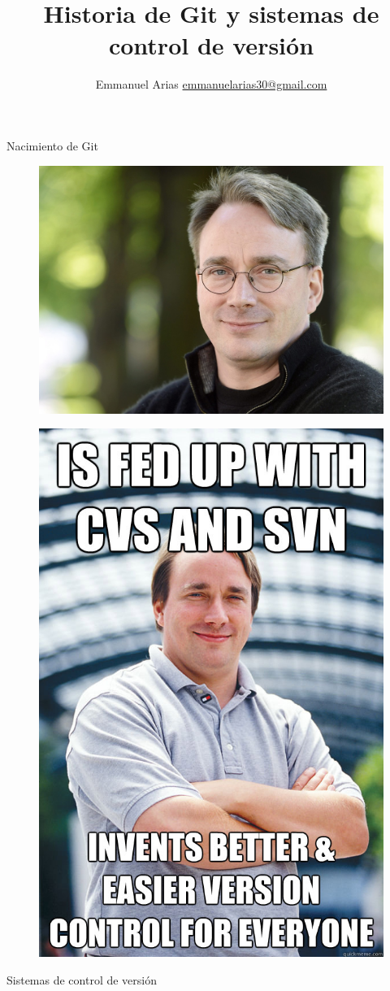 \documentclass{beamer}
\title{Historia de Git y sistemas de control de versión}
\author{Emmanuel Arias \href{mailto:emmanuelarias30@gmail.com}{emmanuelarias30@gmail.com}}
\begin{document}
\begin{frame}[plain]
    \maketitle
\end{frame}

\begin{frame}{Nacimiento de Git}
	\begin{figure}[H]
		\centering
		\includegraphics[width=0.7\linewidth]{img/LinusTorvalds}
		\label{fig:linustorvalds}
	\end{figure}
\end{frame}

\begin{frame}
	\begin{figure}
		\centering
		\includegraphics[width=0.4\linewidth]{img/genius}
		\label{fig:genius}
	\end{figure}
\end{frame}

\begin{frame}
	\Huge Sistemas de control de versión
\end{frame}
\end{document}
